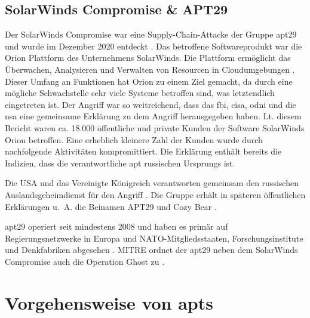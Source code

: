 \documentclass[conference]{IEEEtran}
\begin{document}
\subsection{SolarWinds Compromise \& APT29}
\label{sec:introduction:solarwinds}

Der SolarWinds Compromise war eine Supply-Chain-Attacke der Gruppe \ac{apt}29 und wurde im Dezember 2020 entdeckt \cite{MITRESolarwindsCompromise}.
Das betroffene Softwareprodukt war die Orion Plattform des Unternehmens SolarWinds.
Die Plattform ermöglicht das Überwachen, Analysieren und Verwalten von Resourcen in Cloudumgebungen \cite{OrionPlatform}.
Dieser Umfang an Funktionen hat Orion zu einem Ziel gemacht, da durch eine mögliche Schwachstelle sehr viele Systeme betroffen sind, was letztendlich eingetreten ist.
Der Angriff war so weitreichend, dass das \ac{fbi}, \ac{cisa}, \ac{odni} und die \ac{nsa} eine gemeinsame Erklärung \cite{JointStatement} zu dem Angriff herausgegeben haben.
Lt. diesem Bericht waren ca. 18.000 öffentliche und private Kunden der Software SolarWinds Orion betroffen.
Eine erheblich kleinere Zahl der Kunden wurde durch nachfolgende Aktivitäten kompromittiert.
Die Erklärung enthält bereits die Indizien, dass die verantwortliche \ac{apt} russischen Ursprungs ist.

Die USA und das Vereinigte Königreich verantworten gemeinsam den russischen Auslandsgeheimdienst für den Angriff \cite{USUKSVR}.
Die Gruppe erhält in späteren öffentlichen Erklärungen u.~A. die Beinamen APT29 und Cozy Bear \cite{CybersecurityAdvisoryAPT29}.

\ac{apt}29 operiert seit mindestens 2008 und haben es primär auf Regierungsnetzwerke in Europa und NATO-Mitgliedsstaaten, Forschungsinstitute und Denkfabriken abgesehen \cite{MITREAPT29}.
MITRE ordnet der \ac{apt}29 neben dem SolarWinds Compromise auch die Operation Ghost zu \cite{MITREAPT29}.

\section{Vorgehensweise von \aclp{apt}}
\end{document}
